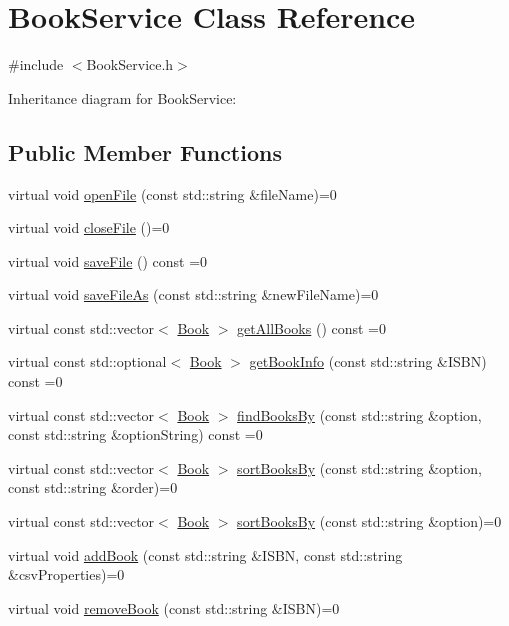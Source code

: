 \hypertarget{classBookService}{}\section{Book\+Service Class Reference}
\label{classBookService}


{\ttfamily \#include $<$Book\+Service.\+h$>$}



Inheritance diagram for Book\+Service\+:
\subsection*{Public Member Functions}
\begin{DoxyCompactItemize}
\item 
virtual void \hyperlink{classBookService_ad74916338cb66cfa8ae7dc24f60dec0e}{open\+File} (const std\+::string \&file\+Name)=0
\item 
virtual void \hyperlink{classBookService_af002fdac384bbaa9d6db2de419163c82}{close\+File} ()=0
\item 
virtual void \hyperlink{classBookService_ade2db5e76a84d7535d43e307d955d9c3}{save\+File} () const =0
\item 
virtual void \hyperlink{classBookService_aa98047f82d65f0514b1e7add838ecbe7}{save\+File\+As} (const std\+::string \&new\+File\+Name)=0
\item 
virtual const std\+::vector$<$ \hyperlink{classBook}{Book} $>$ \hyperlink{classBookService_a032755934b16f7c93078b54aaf2f6128}{get\+All\+Books} () const =0
\item 
virtual const std\+::optional$<$ \hyperlink{classBook}{Book} $>$ \hyperlink{classBookService_ad9da09e509b68ab1f7d93792206ce13c}{get\+Book\+Info} (const std\+::string \&I\+S\+BN) const =0
\item 
virtual const std\+::vector$<$ \hyperlink{classBook}{Book} $>$ \hyperlink{classBookService_a07bfc2c15f92d0b7dafba7464eff48e1}{find\+Books\+By} (const std\+::string \&option, const std\+::string \&option\+String) const =0
\item 
virtual const std\+::vector$<$ \hyperlink{classBook}{Book} $>$ \hyperlink{classBookService_a6336a7b95ae7a0d0e77782607d2a0dc3}{sort\+Books\+By} (const std\+::string \&option, const std\+::string \&order)=0
\item 
virtual const std\+::vector$<$ \hyperlink{classBook}{Book} $>$ \hyperlink{classBookService_a36b487f2828791a9956a491f5147471d}{sort\+Books\+By} (const std\+::string \&option)=0
\item 
virtual void \hyperlink{classBookService_a10744fb09191f0d2811d766aa1124931}{add\+Book} (const std\+::string \&I\+S\+BN, const std\+::string \&csv\+Properties)=0
\item 
virtual void \hyperlink{classBookService_ad5736bdaca83fcfeb262b6af0ec5967a}{remove\+Book} (const std\+::string \&I\+S\+BN)=0
\end{DoxyCompactItemize}



